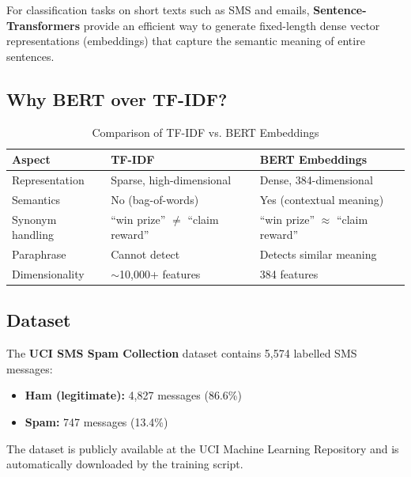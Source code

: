 \documentclass[12pt,a4paper]{article}
\begin{document}
For classification tasks on short texts such as SMS and emails, \textbf{Sentence-Transformers} provide an efficient way to generate fixed-length dense vector representations (embeddings) that capture the semantic meaning of entire sentences.

\subsection{Why BERT over TF-IDF?}
\begin{table}[H]
\centering
\renewcommand{\arraystretch}{1.3}
\begin{tabular}{|l|l|l|}
\hline
\textbf{Aspect} & \textbf{TF-IDF} & \textbf{BERT Embeddings} \\
\hline
Representation     & Sparse, high-dimensional       & Dense, 384-dimensional \\
Semantics          & No (bag-of-words)              & Yes (contextual meaning) \\
Synonym handling   & ``win prize'' $\neq$ ``claim reward'' & ``win prize'' $\approx$ ``claim reward'' \\
Paraphrase         & Cannot detect                  & Detects similar meaning \\
Dimensionality     & $\sim$10,000+ features         & 384 features \\
\hline
\end{tabular}
\caption{Comparison of TF-IDF vs. BERT Embeddings}
\end{table}

\subsection{Dataset}
The \textbf{UCI SMS Spam Collection} dataset contains 5,574 labelled SMS messages:
\begin{itemize}
    \item \textbf{Ham (legitimate):} 4,827 messages (86.6\%)
    \item \textbf{Spam:} 747 messages (13.4\%)
\end{itemize}
The dataset is publicly available at the UCI Machine Learning Repository and is automatically downloaded by the training script.
\end{document}
